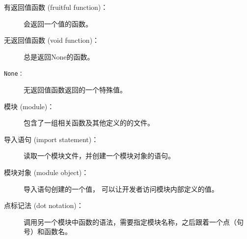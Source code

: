 \begin{description}
\item[有返回值函数 (fruitful function)：] 会返回一个值的函数。
  


\item[无返回值函数 (void function)：]     总是返回None的函数。
  


\item[\tt None：] 无返回值函数返回的一个特殊值。
  
  


\item[模块 (module)：] 包含了一组相关函数及其他定义的的文件。


\item[导入语句 (import statement)：] 读取一个模块文件，并创建一个模块对象的语句。
  
  


\item[模块对象 (module object)：] 导入语句创建的一个值， 可以让开发者访问模块内部定义的值。
  


\item[点标记法 (dot notation)：] 调用另一个模块中函数的语法，需要指定模块名称，之后跟着一个点（句号）和函数名。
  



\end{description}
